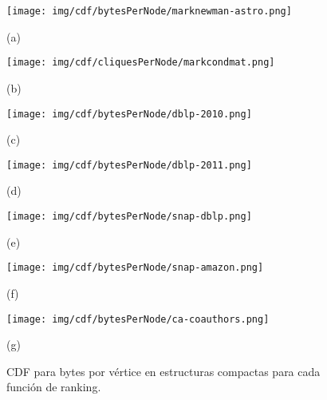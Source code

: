 \begin{figure}
    	\centering
    	\begin{minipage}{1\textwidth}
    		\centering
    		\begin{minipage}{0.45\textwidth}
    			\centering
    			\texttt{[image: img/cdf/bytesPerNode/marknewman-astro.png]}
    			
    			(a)
    		\end{minipage}
    		\begin{minipage}{0.45\textwidth}
    			\centering
    			\texttt{[image: img/cdf/cliquesPerNode/markcondmat.png]}
    			
    			(b)
    		\end{minipage}  		
    	\end{minipage}
    	
    	\begin{minipage}{1\textwidth}
    		\centering
    		\begin{minipage}{0.45\textwidth}
    			\centering
    			\texttt{[image: img/cdf/bytesPerNode/dblp-2010.png]}
    			
    			(c)
    		\end{minipage}
    		\begin{minipage}{0.45\textwidth}
    			\centering
    			\texttt{[image: img/cdf/bytesPerNode/dblp-2011.png]}
    			
    			(d)
    		\end{minipage}  
    	\end{minipage}
    	
    \begin{minipage}{1\textwidth}
    		\centering
    		\begin{minipage}{0.45\textwidth}
    			\centering
    			\texttt{[image: img/cdf/bytesPerNode/snap-dblp.png]}
    			
    			(e)
    		\end{minipage}
    		\begin{minipage}{0.45\textwidth}
    			\centering
    			\texttt{[image: img/cdf/bytesPerNode/snap-amazon.png]}
    			
    			(f)
    		\end{minipage}  
    	\end{minipage}
    	
    	\begin{minipage}{0.45\textwidth}
    		\centering
    		\texttt{[image: img/cdf/bytesPerNode/ca-coauthors.png]}
    		
    		(g)
    	\end{minipage}  
    \caption{CDF para bytes por vértice en estructuras compactas para cada función de ranking.}
    \label{fig:cdfBPN}
\end{figure}
